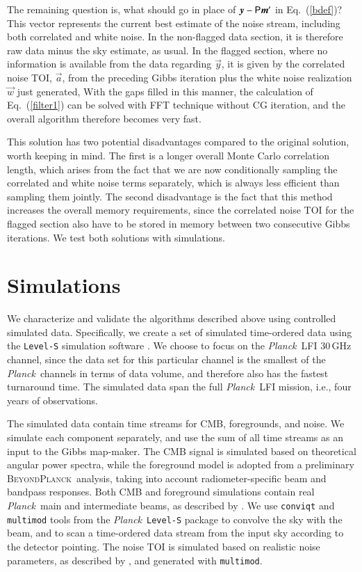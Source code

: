 \documentclass[twocolumn]{aa}
\newcommand{\ve}[1]{{\vec #1}}
\newcommand{\ma}[1]{\tens{#1}}
\newcommand{\BP}{\textsc{BeyondPlanck}}
\def\Planck{\textit{Planck}}
\begin{document}
The remaining question is, what should go in place of $\ve y-\ma P\ve m'$ in
Eq.~(\ref{bdef})?  This vector represents the current best estimate of
the noise stream, including both correlated and white noise.  In the
non-flagged data section, it is therefore raw data minus the sky
estimate, as usual.  In the flagged section, where no information is available
from the data regarding $\ve y$, it is given by the correlated noise
TOI, $\ve a$, from the preceding Gibbs iteration plus the white noise
realization $\ve w$ just generated, With the gaps filled in this manner, the calculation of
Eq.~(\ref{filter1}) can be solved with FFT technique without CG
iteration, and the overall algorithm therefore becomes very fast.

This solution has two potential disadvantages compared to the
original solution, worth keeping in mind. The first is a longer overall Monte Carlo
correlation length, which arises from the fact that we are now
conditionally sampling the correlated and white noise terms separately, which is
always less efficient than sampling them jointly. The second
disadvantage is the fact that this method increases the overall memory
requirements, since the correlated noise TOI for the flagged section 
also have to be stored in memory between two consecutive Gibbs iterations.
We test both solutions with simulations.

\section{Simulations}
\label{sec:simulations}

We characterize and validate the algorithms described above using
controlled simulated data.  Specifically, we create a set of simulated
time-ordered data using the {\tt{Level-S}} simulation
software \citep{reinecke2006}. We choose to focus on the \Planck\ LFI
30\,GHz channel, since the data set for this particular channel is the
smallest of the \Planck\ channels in terms of data volume, and
therefore also has the fastest turnaround time.  The simulated data
span the full \Planck\ LFI mission, i.e., four years of observations.

The simulated data contain time streams for CMB, foregrounds, and
noise. We simulate each component separately, and use the sum of all
time streams as an input to the Gibbs map-maker. The CMB signal is
simulated based on theoretical angular power spectra, while the
foreground model is adopted from a preliminary \BP\ analysis, taking
into account radiometer-specific beam and bandpass responses. Both CMB
and foreground simulations contain real \Planck\ main and intermediate
beams, as described by \citet{planck2014-a05}. We use {\tt{conviqt}}
\citep{prezeau2010} and {\tt{multimod}} tools from the
\Planck\ {\tt{Level-S}} package to convolve the sky with the beam, and to
scan a time-ordered data stream from the input sky according to the
detector pointing.  The noise TOI is simulated based on realistic
noise parameters, as described by \citet{planck2014-a03}, 
and generated with {\tt{multimod}}.
\end{document}
